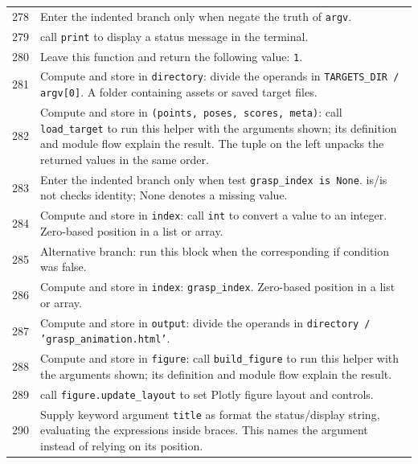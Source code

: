\documentclass[11pt,a4paper]{book}
\begin{document}
\begin{longtable}{r p{}}
278 & Enter the indented branch only when negate the truth of \texttt{argv}. \\

279 & call \texttt{print} to display a status message in the terminal. \\

280 & Leave this function and return the following value: \texttt{1}. \\

281 & Compute and store in \texttt{directory}: divide the operands in \texttt{TARGETS\_DIR / argv[0]}. A folder containing assets or saved target files. \\

282 & Compute and store in \texttt{(points, poses, scores, meta)}: call \texttt{load\_target} to run this helper with the arguments shown; its definition and module flow explain the result. The tuple on the left unpacks the returned values in the same order. \\

283 & Enter the indented branch only when test \texttt{grasp\_index is None}. is/is not checks identity; None denotes a missing value. \\

284 & Compute and store in \texttt{index}: call \texttt{int} to convert a value to an integer. Zero-based position in a list or array. \\

285 & Alternative branch: run this block when the corresponding if condition was false. \\

286 & Compute and store in \texttt{index}: \texttt{grasp\_index}. Zero-based position in a list or array. \\

287 & Compute and store in \texttt{output}: divide the operands in \texttt{directory / 'grasp\_animation.html'}.  \\

288 & Compute and store in \texttt{figure}: call \texttt{build\_figure} to run this helper with the arguments shown; its definition and module flow explain the result.  \\

289 & call \texttt{figure.update\_layout} to set Plotly figure layout and controls. \\

290 & Supply keyword argument \texttt{title} as format the status/display string, evaluating the expressions inside braces. This names the argument instead of relying on its position. \\


\end{longtable}
\end{document}
